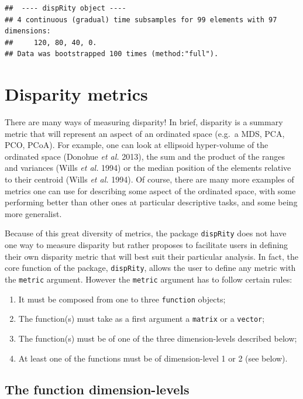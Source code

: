 \documentclass[]{book}
\providecommand{\tightlist}{%
  \setlength{\itemsep}{0pt}\setlength{\parskip}{0pt}}
\theoremstyle{definition}
\theoremstyle{definition}
\theoremstyle{remark}
\begin{document}
\begin{verbatim}
##  ---- dispRity object ---- 
## 4 continuous (gradual) time subsamples for 99 elements with 97 dimensions:
##     120, 80, 40, 0.
## Data was bootstrapped 100 times (method:"full").
\end{verbatim}

\hypertarget{disparity-metrics}{\section{Disparity
metrics}\label{disparity-metrics}}

There are many ways of measuring disparity! In brief, disparity is a
summary metric that will represent an aspect of an ordinated space
(e.g.~a MDS, PCA, PCO, PCoA). For example, one can look at ellipsoid
hyper-volume of the ordinated space (Donohue \emph{et al.} 2013), the
sum and the product of the ranges and variances (Wills \emph{et al.}
1994) or the median position of the elements relative to their centroid
(Wills \emph{et al.} 1994). Of course, there are many more examples of
metrics one can use for describing some aspect of the ordinated space,
with some performing better than other ones at particular descriptive
tasks, and some being more generalist.

Because of this great diversity of metrics, the package
\texttt{dispRity} does not have one way to measure disparity but rather
proposes to facilitate users in defining their own disparity metric that
will best suit their particular analysis. In fact, the core function of
the package, \texttt{dispRity}, allows the user to define any metric
with the \texttt{metric} argument. However the \texttt{metric} argument
has to follow certain rules:

\begin{enumerate}
\def\labelenumi{\arabic{enumi}.}
\tightlist
\item
  It must be composed from one to three \texttt{function} objects;
\item
  The function(s) must take as a first argument a \texttt{matrix} or a
  \texttt{vector};
\item
  The function(s) must be of one of the three dimension-levels described
  below;
\item
  At least one of the functions must be of dimension-level 1 or 2 (see
  below).
\end{enumerate}

\subsection{The function
dimension-levels}\label{the-function-dimension-levels}
\end{document}
